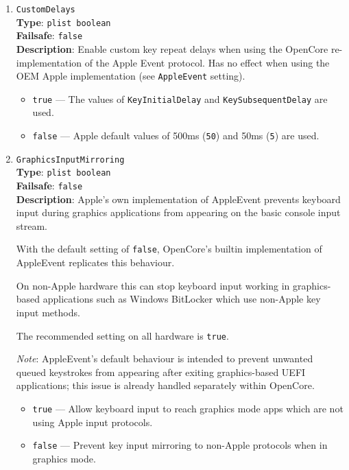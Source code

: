 \documentclass[]{article}
\providecommand{\tightlist}{%
  \setlength{\itemsep}{0pt}\setlength{\parskip}{0pt}}
\begin{document}
\begin{enumerate}
\item
  \texttt{CustomDelays}\\
  \textbf{Type}: \texttt{plist\ boolean}\\
  \textbf{Failsafe}: \texttt{false}\\
  \textbf{Description}: Enable custom key repeat delays when using the OpenCore re-implementation
  of the Apple Event protocol.
  Has no effect when using the OEM Apple implementation (see \texttt{AppleEvent} setting).

  \begin{itemize}
  \tightlist
  \item \texttt{true} --- The values of \texttt{KeyInitialDelay} and \texttt{KeySubsequentDelay} are used.
  \item \texttt{false} --- Apple default values of 500ms (\texttt{50}) and 50ms (\texttt{5}) are used.
  \end{itemize}

\item
  \texttt{GraphicsInputMirroring}\\
  \textbf{Type}: \texttt{plist\ boolean}\\
  \textbf{Failsafe}: \texttt{false}\\
  \textbf{Description}:
  Apple’s own implementation of AppleEvent prevents keyboard input during graphics applications from appearing
  on the basic console input stream.

  With the default setting of \texttt{false}, OpenCore's builtin implementation of AppleEvent replicates this behaviour.

  On non-Apple hardware this can stop keyboard input working in graphics-based applications such as Windows BitLocker
  which use non-Apple key input methods.

  The recommended setting on all hardware is \texttt{true}.

  \emph{Note}: AppleEvent's default behaviour is intended to prevent unwanted queued keystrokes from appearing
  after exiting graphics-based UEFI applications; this issue is already handled separately within OpenCore.

  \begin{itemize}
  \tightlist
  \item \texttt{true} --- Allow keyboard input to reach graphics mode apps which are not using Apple input protocols.
  \item \texttt{false} --- Prevent key input mirroring to non-Apple protocols when in graphics mode.
  \end{itemize}


\end{enumerate}
\end{document}
